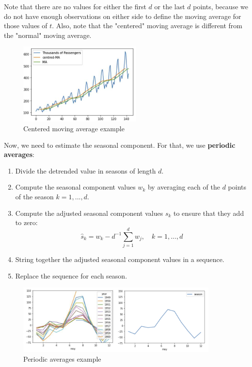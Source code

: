 Note that there are no values for either the first $d$ or the last $d$ points, 
because we do not have enough observations on either side to define the moving 
average for those values of $t$. Also, note that the "centered" moving average
is different from the "normal" moving average.

\begin{figure}[H]
    \centering
    \includegraphics[width=0.55\textwidth]{figures/centered_MA.png}
    \caption{Centered moving average example}
    \label{fig:centered_MA}
\end{figure}

Now, we need to estimate the seasonal component. For that, we use \textbf{periodic
averages}:

\begin{enumerate}
    \item Divide the detrended value in seasons of length $d$. 
    \item Compute the seasonal component values $w_k$ by averaging each of the $d$
    points of the season $k = 1, ..., d$.
    \item Compute the adjusted seasonal component values $s_k$ to ensure that they
    add to zero:
    $$\hat{s}_k = w_k - d^{-1} \sum_{j=1}^d w_j, \quad k = 1, ..., d$$

    \item String together the adjusted seasonal component values in a sequence.
    \item Replace the sequence for each season.
\end{enumerate}

\begin{figure}[H]
    \centering
    \includegraphics[width=0.9\textwidth]{figures/season_extraction.png}
    \caption{Periodic averages example}
    \label{fig:periodic_avg}
\end{figure}

